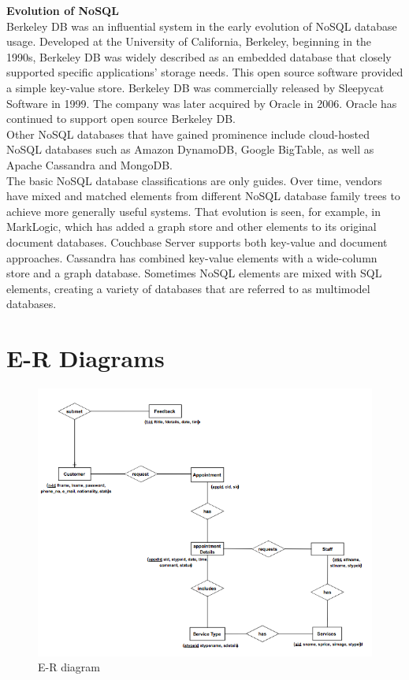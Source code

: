 \textbf{Evolution of NoSQL}\\
Berkeley DB was an influential system in the early evolution of NoSQL database usage. Developed at the University of California, Berkeley, beginning in the 1990s, Berkeley DB was widely described as an embedded database that closely supported specific applications' storage needs. This open source software provided a simple key-value store. Berkeley DB was commercially released by Sleepycat Software in 1999. The company was later acquired by Oracle in 2006. Oracle has continued to support open source Berkeley DB.\\
Other NoSQL databases that have gained prominence include cloud-hosted NoSQL databases such as Amazon DynamoDB, Google BigTable, as well as Apache Cassandra and MongoDB.\\
The basic NoSQL database classifications are only guides. Over time, vendors have mixed and matched elements from different NoSQL database family trees to achieve more generally useful systems. That evolution is seen, for example, in MarkLogic, which has added a graph store and other elements to its original document databases.  Couchbase Server supports both key-value and document approaches.  Cassandra has combined key-value elements with a wide-column store and a graph database. Sometimes NoSQL elements are mixed with SQL elements, creating a variety of databases that are referred to as multimodel databases. 

\section{E-R Diagrams}
\begin{figure}[h]
	\centering
	\includegraphics[width=1.0\linewidth]{erdiagram}
	\caption{E-R diagram}
	\label{fig:erdiagram}
\end{figure}

